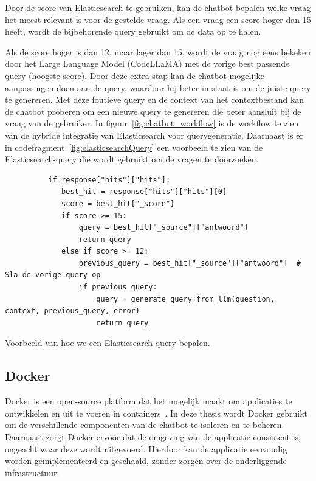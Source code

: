 Door de score van Elasticsearch te gebruiken, kan de chatbot bepalen welke vraag het meest relevant is voor de gestelde vraag.
Als een vraag een score hoger dan 15 heeft, wordt de bijbehorende query gebruikt om de data op te halen.

Als de score hoger is dan 12, maar lager dan 15, wordt de vraag nog eens bekeken door het Large Language Model (CodeLLaMA) met de vorige best passende query (hoogste score).
Door deze extra stap kan de chatbot mogelijke aanpassingen doen aan de query, waardoor hij beter in staat is om de juiste query te genereren.
Met deze foutieve query en de context van het contextbestand kan de chatbot proberen om een nieuwe query te genereren die beter aansluit bij de vraag van de gebruiker.
In figuur~\ref{fig:chatbot_workflow} is de workflow te zien van de hybride integratie van Elasticsearch voor querygeneratie.
Daarnaast is er in codefragment~\ref{fig:elasticsearchQuery} een voorbeeld te zien van de Elasticsearch-query die wordt gebruikt om de vragen te doorzoeken.

\begin{listing}[H]
     \begin{verbatim}
          if response["hits"]["hits"]:
             best_hit = response["hits"]["hits"][0]
             score = best_hit["_score"]
             if score >= 15:
                 query = best_hit["_source"]["antwoord"]
                 return query
             else if score >= 12:
                 previous_query = best_hit["_source"]["antwoord"]  # Sla de vorige query op
                 if previous_query:
                     query = generate_query_from_llm(question, context, previous_query, error)
                     return query
     \end{verbatim}
     \caption[Voorbeeld Elasticsearch query bepalen]{\label{fig:elasticsearchQuery}Voorbeeld van hoe we een Elasticsearch query bepalen.}
 \end{listing}

\subsection{Docker}
Docker is een open-source platform dat het mogelijk maakt om applicaties te ontwikkelen en uit te voeren in containers~\autocite{docker2025}.
In deze thesis wordt Docker gebruikt om de verschillende componenten van de chatbot te isoleren en te beheren.
Daarnaast zorgt Docker ervoor dat de omgeving van de applicatie consistent is, ongeacht waar deze wordt uitgevoerd.
Hierdoor kan de applicatie eenvoudig worden geïmplementeerd en geschaald, zonder zorgen over de onderliggende infrastructuur.

